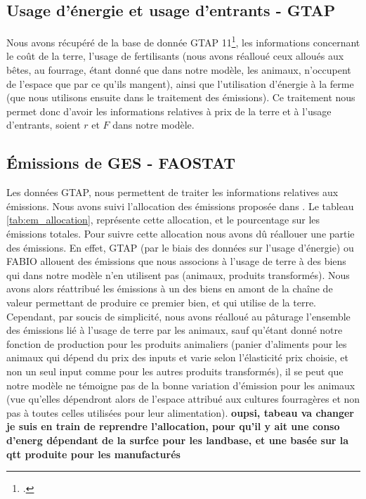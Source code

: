 \subsection{Usage d'énergie et usage d'entrants - GTAP}

Nous avons récupéré de la base de donnée GTAP 11\footcite{Aguiar2022}, les informations concernant le coût de la terre, l'usage de fertilisants (nous avons réalloué ceux alloués aux bêtes, au fourrage, étant donné que dans notre modèle, les animaux, n'occupent de l'espace que par ce qu'ils mangent), ainsi que l'utilisation d'énergie à la ferme (que nous utilisons ensuite dans le traitement des émissions). Ce traitement nous permet donc d'avoir les informations relatives à prix de la terre et à l'usage d'entrants, soient $r$ et $F$ dans notre modèle.


\subsection{Émissions de GES - FAOSTAT}

Les données GTAP, nous permettent de traiter les informations relatives aux émissions. Nous avons suivi l'allocation des émissions proposée dans \cite{Valin2023}. Le tableau \ref{tab:em_allocation}, représente cette allocation, et le pourcentage sur les émissions totales. Pour suivre cette allocation nous avons dû réallouer une partie des émissions. En effet, GTAP (par le biais des données sur l'usage d'énergie) ou FABIO allouent des émissions que nous associons à l'usage de terre à des biens qui dans notre modèle n'en utilisent pas (animaux, produits transformés). Nous avons alors réattribué les émissions à un des biens en amont de la chaîne de valeur permettant de produire ce premier bien, et qui utilise de la terre. Cependant, par soucis de simplicité, nous avons réalloué au pâturage l'ensemble des émissions lié à l'usage de terre par les animaux, sauf qu'étant donné notre fonction de production pour les produits animaliers (panier d'aliments pour les animaux qui dépend du prix des inputs et varie selon l'élasticité prix choisie, et non un seul input comme pour les autres produits transformés), il se peut que notre modèle ne témoigne pas de la bonne variation d'émission pour les animaux (vue qu'elles dépendront alors de l'espace attribué aux cultures fourragères et non pas à toutes celles utilisées pour leur alimentation). \textbf{oupsi, tabeau va changer je suis en train de reprendre l'allocation, pour qu'il y ait une conso d'energ dépendant de la surfce pour les landbase, et une basée sur la qtt produite pour les manufacturés}

